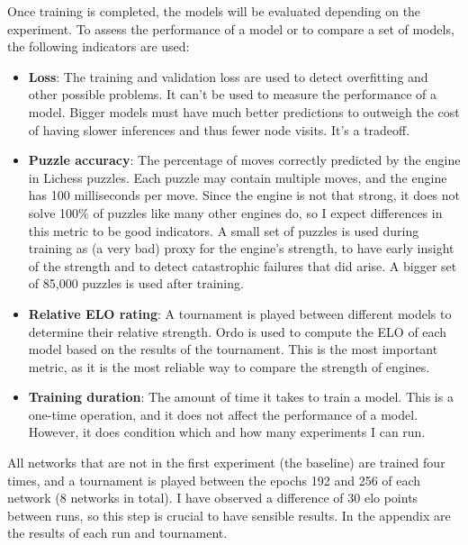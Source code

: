Once training is completed, the models will be evaluated depending on the experiment. To assess the performance of a model or to compare a set of models, the following indicators are used:

\begin{itemize}
\item \textbf{Loss}: The training and validation loss are used to detect overfitting and other possible problems. It can't be used to measure the performance of a model. Bigger models must have much better predictions to outweigh the cost of having slower inferences and thus fewer node visits. It's a tradeoff.

\item \textbf{Puzzle accuracy}: The percentage of moves correctly predicted by the engine in Lichess puzzles. Each puzzle may contain multiple moves, and the engine has 100 milliseconds per move. Since the engine is not that strong, it does not solve 100\% of puzzles like many other engines do, so I expect differences in this metric to be good indicators. A small set of puzzles is used during training as (a very bad) proxy for the engine's strength, to have early insight of the strength and to detect catastrophic failures that did arise. A bigger set of 85,000 puzzles is used after training.

\item \textbf{Relative ELO rating}: A tournament is played between different models to determine their relative strength. Ordo is used to compute the ELO of each model based on the results of the tournament. This is the most important metric, as it is the most reliable way to compare the strength of engines.


\item \textbf{Training duration}: The amount of time it takes to train a model. This is a one-time operation, and it does not affect the performance of a model. However, it does condition which and how many experiments I can run.
\end{itemize}

All networks that are not in the first experiment (the baseline) are trained four times, and a tournament is played between the epochs 192 and 256 of each network (8 networks in total). I have observed a difference of 30 elo points between runs, so this step is crucial to have sensible results. In the appendix are the results of each run and tournament.

